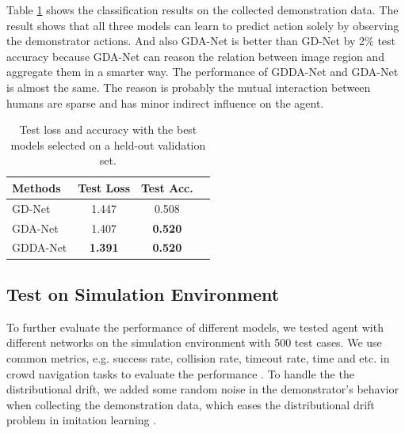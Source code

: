 \documentclass[10pt,twocolumn,letterpaper]{article}
\begin{document}
Table \ref{tb:classification_results} shows the classification results on the collected demonstration data. The result shows that all three models can learn to predict action solely by observing the demonstrator actions. And also GDA-Net is better than GD-Net by 2\% test accuracy because GDA-Net can reason the relation between image region and aggregate them in a smarter way. The performance of GDDA-Net and GDA-Net is almost the same. The reason is probably the mutual interaction between humans are sparse and has minor indirect influence on the agent. 

\begin{table} \label{tb:classification_results}
\begin{center}
\begin{tabular}{|l|c|c|c|}
\hline
Methods & Test Loss & Test Acc. \\
\hline
GD-Net   & 1.447 & 0.508 \\
GDA-Net  & 1.407 & \textbf{0.520} \\
GDDA-Net & \textbf{1.391} & \textbf{0.520} \\
\hline
\end{tabular}
\end{center}
\caption{Test loss and accuracy with the best models selected on a held-out validation set.}
\end{table}




\subsection{Test on Simulation Environment}
To further evaluate the performance of different models, we tested agent with different networks on the simulation environment with 500 test cases. We use common metrics, e.g. success rate, collision rate, timeout rate, time and etc. in crowd navigation tasks to evaluate the performance \cite{everett_motion_2018, chen_crowd-robot_2018}. To handle the the distributional drift, we added some random noise in the demonstrator's behavior when collecting the demonstration data, which eases the distributional drift problem in imitation learning \cite{}.
\end{document}
